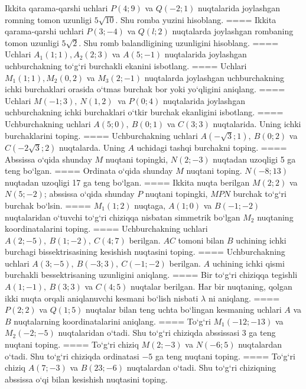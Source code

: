 Ikkita qarama-qarshi uchlari \(P (4;9) \) va \(Q (-2; 1) \) nuqtalarida joylashgan romning tomon uzunligi \(5\sqrt{10}\). Shu
romba yuzini hisoblang.
====
Ikkita qarama-qarshi uchlari $P (3; -4) $ va $Q (l;2) $ nuqtalarda joylashgan rombaning tomon uzunligi \(5\sqrt{2}\). Shu romb balandligining uzunligini hisoblang.
====
Uchlari $A_1 (1; 1), A_2 (2; 3) $ va $A (5;-1) $
nuqtalarida joylashgan uchburchakning to‘g‘ri burchakli ekanini isbotlang.
====
Uchlari \(M_{1} (1;1), M_{2} (0,2) \) va
\(M_{3} (2;-1) \) nuqtalarda joylashgan uchburchakning ichki 
burchaklari orasida o‘tmas burchak bor yoki yo‘qligini aniqlang.
====
Uchlari \(M (-1;3),\ N (1,2) \ \) va \(P (0;4) \)
nuqtalarida joylashgan uchburchakning ichki burchaklari o‘tkir burchak
ekanligini isbotlang.
====
Uchburchakning uchlari \(A (5;0),\ B (0;1) \) va \(C (3;3) \)
nuqtalarida. Uning ichki burchaklarini toping.
====
Uchburchakning uchlari
\(A\left(-\sqrt{3};1 \right),\ B (0;2) \) va
\(C\left(-2\sqrt{3};2 \right) \) nuqtalarda. Uning $A$
uchidagi tashqi burchakni toping.
====
Abssissa o‘qida shunday $M$ nuqtani topingki,
\(N (2;-3) \) nuqtadan uzoqligi 5 ga teng bo‘lgan.
====
Ordinata o‘qida shunday $M$ nuqtani toping.
\(N (-8;13) \) nuqtadan uzoqligi 17 ga teng bo‘lgan.
====
Ikkita nuqta berilgan \(M (2;2) \) va \(N (5;-2) \); abssissa o‘qida shunday $P$ nuqtani topingki, $MPN$ burchak to‘g‘ri burchak bo‘lsin.
====
\(M_{1} (1;2) \) nuqtaga, \(A (1;0) \) va \(B (-1;-2) \)
nuqtalaridan o‘tuvchi to‘g‘ri chiziqqa nisbatan simmetrik bo‘lgan \(M_{2}\) nuqtaning koordinatalarini toping.
====
Uchburchakning uchlari \(A (2;-5),\ B (1;-2),\ C (4;7) \)
berilgan. $AC$ tomoni bilan $B$ uchining ichki burchagi
bissektrisasining kesishish nuqtasini toping.
====
Uchburchakning uchlari
\(A (3;-5),\ B (-3;3),\ C (-1;-2) \) berilgan. $A$ uchining ichki qismi
burchakli bessektrisaning uzunligini aniqlang.
====
Bir to‘g‘ri chiziqqa tegishli \(A (1;-1),\ B (3;3) \) va
\(C (4;5) \) nuqtalar berilgan. Har bir nuqtaning, qolgan ikki nuqta orqali aniqlanuvchi kesmani bo‘lish nisbati $\lambda$ ni aniqlang.
====
\(P (2;2) \) va \(Q (1;5) \) nuqtalar bilan teng uchta
bo‘lingan kesmaning uchlari $A$ va $B$ nuqtalarning
koordinatalarini aniqlang.
====
To‘g‘ri \(M_{1} (-12;-13) \) va \(M_{2} (-2;-5) \)
nuqtalaridan o‘tadi. Shu to‘g‘ri chiziqda abssissasi 3 ga teng nuqtani toping.
====
To‘g‘ri chiziq \(M (2;-3) \) va \(N (-6;5) \) nuqtalardan o‘tadi.
Shu to‘g‘ri chiziqda ordinatasi $-5$ ga teng nuqtani toping.
====
To‘g‘ri chiziq \(A (7;-3) \) va \(B (23;-6) \) nuqtalardan o‘tadi.
Shu to‘g‘ri chiziqning abssissa o‘qi bilan kesishish nuqtasini toping.
